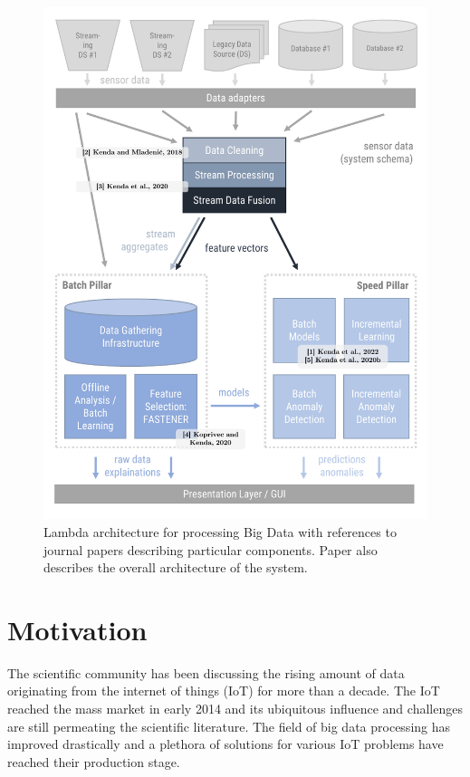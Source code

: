 \begin{figure}
    \centering
    \includegraphics[width=15cm]{figures/the_big_picture_2023a.pdf}
    \caption{Lambda architecture for processing Big Data with references to journal papers describing particular components. Paper \cite{kenda:2022:water-framework} also describes the overall architecture of the system.}
    \label{fig:the_big_picture}
\end{figure}

\section{Motivation}

The scientific community has been discussing the rising amount of data originating from the internet of things (IoT) for more than a decade. The IoT reached the mass market in early 2014 and its ubiquitous influence and challenges are still permeating the scientific literature. 
The field of big data processing has improved drastically and a plethora of solutions for various IoT problems have reached their production stage.

